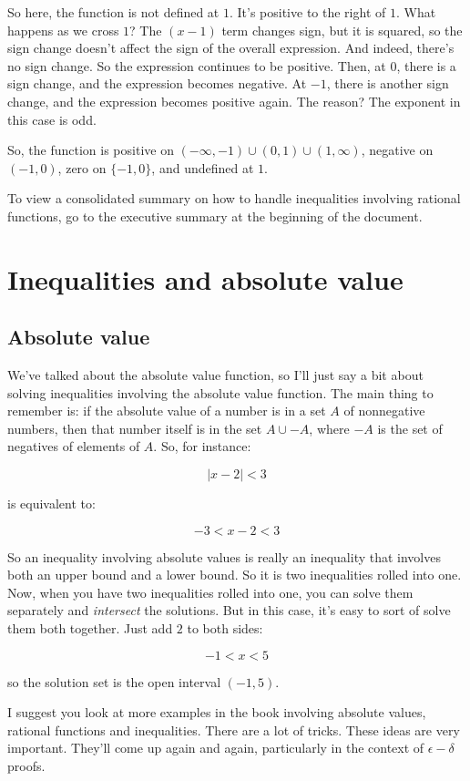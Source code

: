 \documentclass{amsart}
\begin{document}
So here, the function is not defined at $1$. It's positive to the
right of $1$. What happens as we cross $1$? The $(x - 1)$ term changes
sign, but it is squared, so the sign change doesn't affect the sign of
the overall expression. And indeed, there's no sign change. So the
expression continues to be positive. Then, at $0$, there is a sign
change, and the expression becomes negative. At $-1$, there is another
sign change, and the expression becomes positive again. The reason?
The exponent in this case is odd.

So, the function is positive on $(-\infty,-1) \cup (0,1) \cup
(1,\infty)$, negative on $(-1,0)$, zero on $\{ -1,0 \}$, and undefined
at $1$.

To view a consolidated summary on how to handle inequalities involving
rational functions, go to the executive summary at the beginning of
the document.
\section{Inequalities and absolute value}

\subsection{Absolute value}

We've talked about the absolute value function, so I'll just say a bit
about solving inequalities involving the absolute value function. The
main thing to remember is: if the absolute value of a number is in a
set $A$ of nonnegative numbers, then that number itself is in the set
$A \cup -A$, where $-A$ is the set of negatives of elements of
$A$. So, for instance:

$$|x - 2| < 3$$

is equivalent to:

$$-3 < x - 2 < 3$$

So an inequality involving absolute values is really an inequality
that involves both an upper bound and a lower bound. So it is two
inequalities rolled into one. Now, when you have two inequalities
rolled into one, you can solve them separately and {\em intersect} the
solutions. But in this case, it's easy to sort of solve them both
together. Just add $2$ to both sides:

$$-1 < x < 5$$

so the solution set is the open interval $(-1,5)$.

I suggest you look at more examples in the book involving absolute
values, rational functions and inequalities. There are a lot of
tricks. These ideas are very important. They'll come up again and
again, particularly in the context of $\epsilon-\delta$ proofs.
\end{document}
